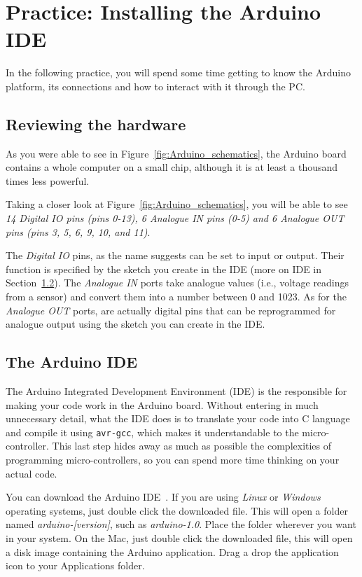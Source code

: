 \section{Practice: Installing the Arduino IDE}\label{pract:settingTheIDE}
In the following practice, you will spend some time getting to know the Arduino platform, its connections and how to interact with it through the PC.

\subsection{Reviewing the hardware}\label{pract:settingTheIDE:hardware}
As you were able to see in Figure~\ref{fig:Arduino_schematics}, the Arduino board contains a whole computer on a small chip, although it is at least a thousand times less powerful.

Taking a closer look at Figure~\ref{fig:Arduino_schematics}, you will be able to see \emph{14 Digital IO pins (pins 0-13), 6 Analogue IN pins (0-5) and 6 Analogue OUT pins (pins 3, 5, 6, 9, 10, and 11)}.

The \emph{Digital IO} pins, as the name suggests can be set to input or output. Their function is specified by the sketch you create in the IDE (more on IDE in Section~\ref{pract:settingTheIDE:IDE}). The \emph{Analogue IN} ports take analogue values (i.e., voltage readings from a sensor) and convert them into a number between 0 and 1023. As for the \emph{Analogue OUT} ports, are actually digital pins that can be reprogrammed for analogue output using the sketch you can create in the IDE.

\subsection{The Arduino IDE}\label{pract:settingTheIDE:IDE}
The Arduino Integrated Development Environment (IDE) is the responsible for making your code work in the Arduino board. Without entering in much unnecessary detail, what the IDE does is to translate your code into C language and compile it using \texttt{avr-gcc}, which makes it understandable to the micro-controller. This last step hides away as much as possible the complexities of programming micro-controllers, so you can spend more time thinking on your actual code.

You can download the Arduino IDE~\emph{}. If you are using \emph{Linux} or \emph{Windows} operating systems, just double click the downloaded file. This will open a folder named \emph{arduino-[version]}, such as \emph{arduino-1.0}. Place the folder wherever you want in your system. On the Mac, just double click the downloaded file, this will open a disk image containing the Arduino application. Drag a drop the application icon to your Applications folder.

